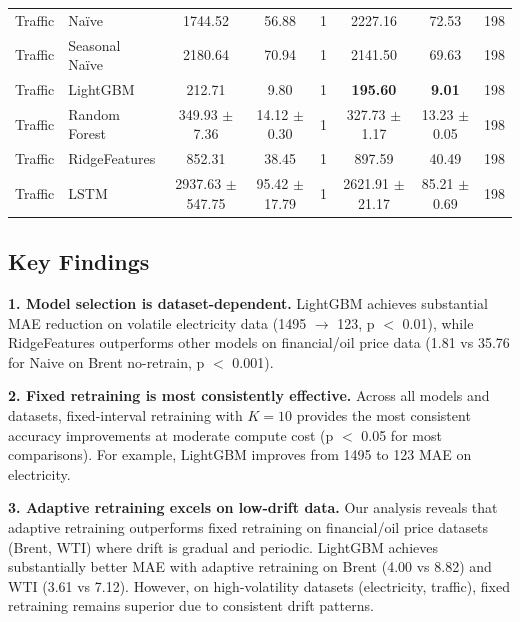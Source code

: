 \documentclass[conference]{IEEEtran}
\begin{document}
\begin{table}[!t]
\begin{tabular}{ll|ccc|ccc}
		\midrule
		Traffic     & Na\"{i}ve              & 1744.52                        & 56.88                              & 1        & 2227.16             & 72.53            & 198      \\
		Traffic     & Seasonal Na\"{i}ve     & 2180.64                        & 70.94                              & 1        & 2141.50             & 69.63            & 198      \\
		Traffic     & LightGBM               & 212.71                         & 9.80                               & 1        & \textbf{195.60}     & \textbf{9.01}    & 198      \\
		Traffic     & Random Forest          & 349.93 $\pm$ 7.36              & 14.12 $\pm$ 0.30                   & 1        & 327.73 $\pm$ 1.17   & 13.23 $\pm$ 0.05 & 198      \\
		Traffic     & RidgeFeatures          & 852.31                         & 38.45                              & 1        & 897.59              & 40.49            & 198      \\
		Traffic     & LSTM                   & 2937.63 $\pm$ 547.75           & 95.42 $\pm$ 17.79                  & 1        & 2621.91 $\pm$ 21.17 & 85.21 $\pm$ 0.69 & 198      \\
		\bottomrule
	\end{tabular}
\end{table}

\subsection{Key Findings}

\textbf{1. Model selection is dataset-dependent.} LightGBM achieves substantial MAE reduction on volatile electricity data (1495 $\rightarrow$ 123, p $<$ 0.01), while RidgeFeatures outperforms other models on financial/oil price data (1.81 vs 35.76 for Naive on Brent no-retrain, p $<$ 0.001).

\textbf{2. Fixed retraining is most consistently effective.} Across all
models and datasets, fixed-interval retraining with $K=10$ provides
the most consistent accuracy improvements at moderate compute cost
(p $<$ 0.05 for most comparisons). For example, LightGBM improves from 1495 to 123 MAE on electricity.

\textbf{3. Adaptive retraining excels on low-drift data.} Our analysis
reveals that adaptive retraining outperforms fixed retraining on
financial/oil price datasets (Brent, WTI) where drift is gradual and
periodic. LightGBM achieves substantially better MAE with adaptive retraining
on Brent (4.00 vs 8.82) and WTI (3.61 vs 7.12). However,
on high-volatility datasets (electricity, traffic), fixed retraining
remains superior due to consistent drift patterns.
\end{document}
